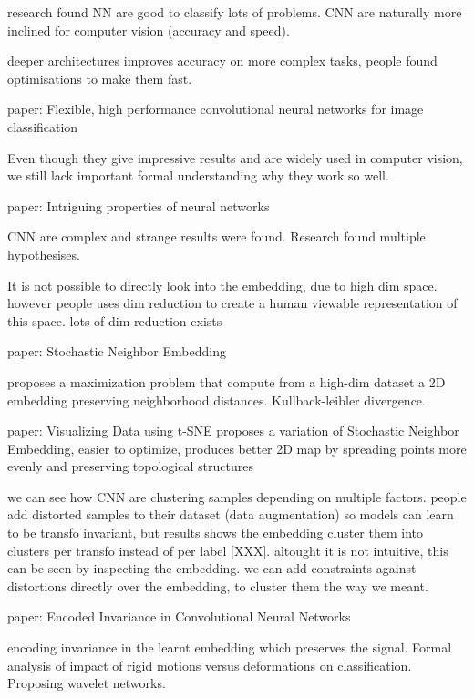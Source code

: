 \documentclass[a4paper,12pt]{report}
\begin{document}
research found NN are good to classify lots of problems. CNN are naturally more inclined for computer vision (accuracy and speed).

deeper architectures improves accuracy on more complex tasks, people found optimisations to make them fast.

paper: Flexible, high performance convolutional neural networks for image classification

Even though they give impressive results and are widely used in computer vision, we still lack important formal understanding why they work so well.

paper: Intriguing properties of neural networks

CNN are complex and strange results were found. Research found multiple hypothesises.


It is not possible to directly look into the embedding, due to high dim space. however people uses dim reduction to create a human viewable representation of this space.
lots of dim reduction exists

paper: Stochastic Neighbor Embedding

proposes a maximization problem that compute from a high-dim dataset a 2D embedding preserving neighborhood distances. Kullback-leibler divergence.

paper: Visualizing Data using t-SNE
proposes a variation of Stochastic Neighbor Embedding, easier to optimize, produces better 2D map by spreading points more evenly and preserving topological structures

we can see how CNN are clustering samples depending on multiple factors.
people add distorted samples to their dataset (data augmentation) so models can learn to be transfo invariant, but results shows the embedding cluster them into clusters per transfo instead of per label [XXX].
altought it is not intuitive, this can be seen by inspecting the embedding.
we can add constraints against distortions directly over the embedding, to cluster them the way we meant.

paper: Encoded Invariance in Convolutional Neural Networks

encoding invariance in the learnt embedding which preserves the signal. Formal analysis of impact of rigid motions versus deformations on classification. Proposing wavelet networks.
\end{document}
